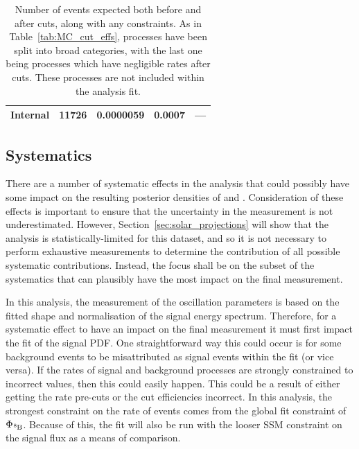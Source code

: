 \begin{table}[!th]
\begin{center}
\begin{tabulary}{\textwidth}{c R R R R}
            Internal       & \num{11726}&0.0000059& 0.0007& --- \\
            \hline
        \end{tabulary}
    \end{center}
    \caption[Number of events expected both before and after cuts, along with any constraints]
    {Number of events expected both before and after cuts, along with any constraints. As in Table~\ref{tab:MC_cut_effs}, processes have been split into broad categories, with the last one being processes which have negligible rates after cuts. These processes are not included within the analysis fit.}
    \label{tab:MC_expected_rates_constraints}
\end{table}



\subsection{Systematics}
There are a number of systematic effects in the analysis that could possibly have some impact on the resulting posterior densities of \tonetwo{} and \dmsq{}. Consideration of these effects is important to ensure that the uncertainty in the measurement is not underestimated. However, Section~\ref{sec:solar_projections} will show that the analysis is statistically-limited for this dataset, and so it is not necessary to perform exhaustive measurements to determine the contribution of all possible systematic contributions. Instead, the focus shall be on the subset of the systematics that can plausibly have the most impact on the final measurement.

In this analysis, the measurement of the oscillation parameters is based on the fitted shape and normalisation of the \beight{} signal energy spectrum. Therefore, for a systematic effect to have an impact on the final measurement it must first impact the fit of the signal PDF. One straightforward way this could occur is for some background events to be misattributed as signal events within the fit (or vice versa). If the rates of signal and background processes are strongly constrained to incorrect values, then this could easily happen. This could be a result of either getting the rate pre-cuts or the cut efficiencies incorrect. In this analysis, the strongest constraint on the rate of events comes from the global fit constraint of $\Phi_{\beight{}}$. Because of this, the fit will also be run with the looser SSM constraint on the signal flux as a means of comparison.

